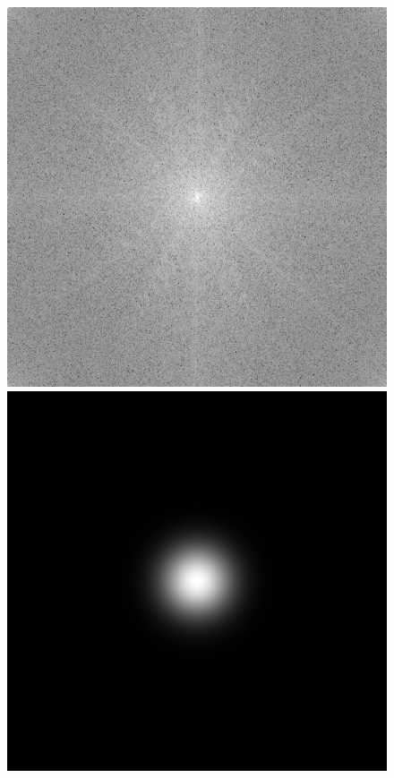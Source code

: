 \documentclass[twoside,twocolumn]{article}
\begin{document}
\begin{figure}[H]
\begin{center}
	\includegraphics[scale=.19]{figures/butterfly_mag_spec_32.png}
	\includegraphics[scale=.19]{figures/butterfly_gau_filter_32.png}

\end{center}
\end{figure}
\end{document}
